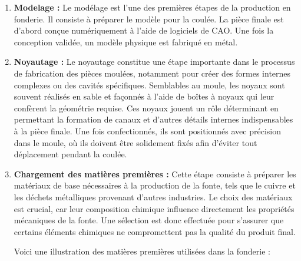\documentclass[12pt]{article}
\begin{document}
\begin{enumerate}
    \item \textbf{Modelage :} 
    Le modélage est l'une des premières étapes de la production en fonderie.
    Il consiste à préparer le modèle pour la coulée.
    La pièce finale est d'abord conçue numériquement à l'aide de logiciels 
    de CAO. Une fois la conception validée, un modèle physique est fabriqué
    en métal.

    \item \textbf{Noyautage :} 
    Le noyautage constitue une étape importante dans le processus de 
    fabrication des pièces moulées, notamment pour créer des formes 
    internes complexes ou des cavités spécifiques. Semblables au moule, 
    les noyaux sont souvent réalisés en sable et façonnés à l'aide de 
    boîtes à noyaux qui leur confèrent la géométrie requise. Ces noyaux 
    jouent un rôle déterminant en permettant la formation de canaux et 
    d'autres détails internes indispensables à la pièce finale. 
    Une fois confectionnés, ils sont positionnés avec précision dans 
    le moule, où ils doivent être solidement fixés afin d'éviter 
    tout déplacement pendant la coulée.

    \item \textbf{Chargement des matières premières :}
    Cette étape consiste à préparer les matériaux de base nécessaires 
    à la production de la fonte, tels que le cuivre et les déchets 
    métalliques provenant d'autres industries. Le choix des matériaux 
    est crucial, car leur composition chimique influence directement 
    les propriétés mécaniques de la fonte. Une sélection est donc effectuée
    pour s'assurer que certains éléments chimiques ne compromettent pas 
    la qualité du produit final.


    Voici une illustration des matières premières utilisées dans la fonderie :


\end{enumerate}
\end{document}
